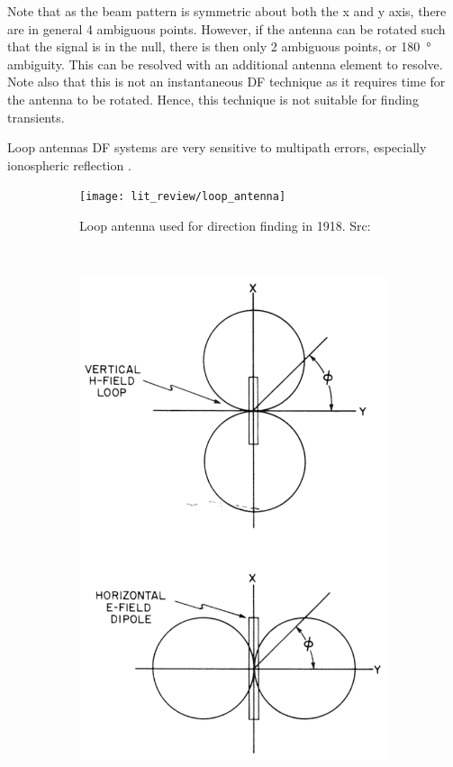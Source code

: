 Note that as the beam pattern is symmetric about both the x and y axis, there are in general 4 ambiguous points. However, if the antenna can be rotated such that the signal is in the null, there is then only 2 ambiguous points, or \SI{180}{\degree} ambiguity. This can be resolved with an  additional antenna element to resolve. Note also that this is not an instantaneous DF technique as it requires time for the antenna to be rotated. Hence, this technique is not suitable for finding transients. 

Loop antennas DF systems are very sensitive to multipath errors, especially ionospheric reflection \cite{jenkins1991smallaperture}. 

\begin{figure}
  \centering
  \begin{subfigure}[b]{0.4\textwidth}
    \texttt{[image: lit\_review/loop\_antenna]}
    \caption{Loop antenna used for direction finding in 1918. Src: \cite{grabau1989funkpeiltechnik}}
  \end{subfigure}
  ~
  \begin{subfigure}[b]{0.4\textwidth}
   \includegraphics[width=\textwidth]{./img/lit_review/loop_antenna_beam}

\end{subfigure}
\end{figure}
